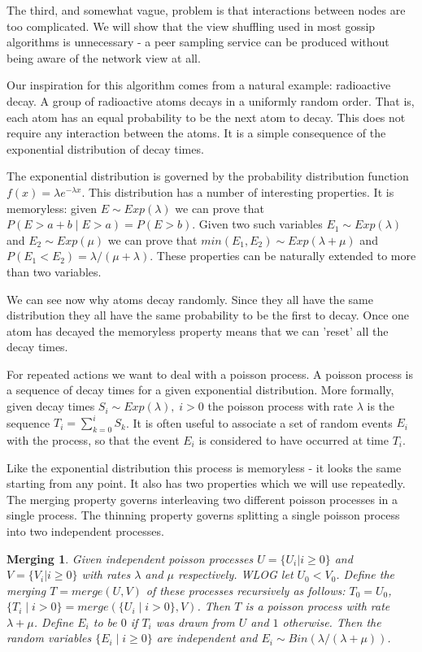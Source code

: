 \documentclass[a4paper,10pt]{article}
\begin{document}
The third, and somewhat vague, problem is that interactions between nodes are too complicated. We will show that the view shuffling used in most gossip algorithms is unnecessary - a peer sampling service can be produced without being aware of the network view at all.

Our inspiration for this algorithm comes from a natural example: radioactive decay. A group of radioactive atoms decays in a uniformly random order. That is, each atom has an equal probability to be the next atom to decay. This does not require any interaction between the atoms. It is a simple consequence of the exponential distribution of decay times.

The exponential distribution is governed by the probability distribution function $ f(x)=\lambda e ^ { - \lambda x } $. This distribution has a number of interesting properties. It is memoryless: given $ E \sim Exp(\lambda) $ we can prove that $ P(E>a+b \;|\; E>a) = P(E>b) $. Given two such variables $ E_1 \sim Exp(\lambda) $ and $ E_2 \sim Exp(\mu) $ we can prove that $ min(E_1,E_2) \sim Exp(\lambda + \mu) $ and $ P(E_1 < E_2) = \lambda / (\mu + \lambda) $. These properties can be naturally extended to more than two variables. 

We can see now why atoms decay randomly. Since they all have the same distribution they all have the same probability to be the first to decay. Once one atom has decayed the memoryless property means that we can 'reset' all the decay times.

For repeated actions we want to deal with a poisson process. A poisson process is a sequence of decay times for a given exponential distribution. More formally, given decay times $S_i \sim Exp(\lambda), \; i>0 $ the poisson process with rate $ \lambda $ is the sequence $ T_i = \sum_{k=0}^i S_k $. It is often useful to associate a set of random events $E_i$ with the process, so that the event $E_i$ is considered to have occurred at time $T_i$. 

Like the exponential distribution this process is memoryless - it looks the same starting from any point. It also has two properties which we will use repeatedly. The merging property governs interleaving two different poisson processes in a single process. The thinning property governs splitting a single poisson process into two independent processes.

\newtheorem*{merging}{Merging}
\begin{merging}
Given independent poisson processes $U=\{U_i | i \geq 0\}$ and $V=\{V_i | i \geq 0\}$ with rates $\lambda$ and $\mu$ respectively. WLOG let $U_0 < V_0$. Define the merging \;$T = merge(U,V)$\; of these processes recursively as follows: $T_0 = U_0$, $\{T_i \;|\; i>0\} = merge(\{U_i \;|\; i>0\}, V)$. Then $T$ is a poisson process with rate $\lambda + \mu$. Define $E_i$ to be $0$ if $T_i$ was drawn from $U$ and $1$ otherwise. Then the random variables $\{E_i \;|\; i \geq 0\}$ are independent and $E_i \sim Bin(\lambda / (\lambda + \mu))$. 
\end{merging}
 
\end{document}
